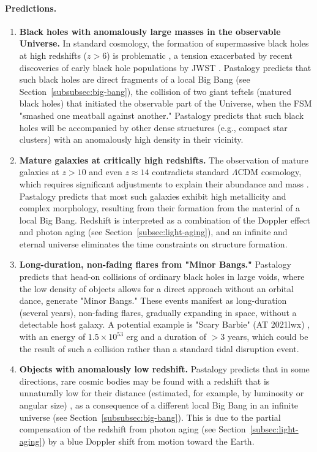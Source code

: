 \documentclass[pdflatex,sn-mathphys-num,referee]{sn-jnl}
\begin{document}
\paragraph{Predictions.}
\begin{enumerate}
    \item \textbf{Black holes with anomalously large masses in the observable Universe.} In standard cosmology, the formation of supermassive black holes at high redshifts (\( z > 6 \)) is problematic \cite{larson2023-jwst-bh}, a tension exacerbated by recent discoveries of early black hole populations by JWST \cite{maiolino2024-jades-bh}. Pastalogy predicts that such black holes are direct fragments of a local Big Bang (see Section~\ref{subsubsec:big-bang}), the collision of two giant teftels (matured black holes) that initiated the observable part of the Universe, when the FSM "smashed one meatball against another." Pastalogy predicts that such black holes will be accompanied by other dense structures (e.g., compact star clusters) with an anomalously high density in their vicinity.    
    \item \textbf{Mature galaxies at critically high redshifts.} The observation of mature galaxies at \( z > 10 \) \cite{labbe2023-jwst-galaxies} and even \( z \approx 14 \) \cite{carniani2024-z14} contradicts standard \(\Lambda\)CDM cosmology, which requires significant adjustments to explain their abundance and mass \cite{lu2024-jwst-lcdm-tension}. Pastalogy predicts that most such galaxies exhibit high metallicity and complex morphology, resulting from their formation from the material of a local Big Bang. Redshift is interpreted as a combination of the Doppler effect and photon aging (see Section~\ref{subsec:light-aging}), and an infinite and eternal universe eliminates the time constraints on structure formation.
    \item \textbf{Long-duration, non-fading flares from "Minor Bangs."} Pastalogy predicts that head-on collisions of ordinary black holes in large voids, where the low density of objects allows for a direct approach without an orbital dance, generate "Minor Bangs." These events manifest as long-duration (several years), non-fading flares, gradually expanding in space, without a detectable host galaxy. A potential example is "Scary Barbie" (AT 2021lwx) \cite{subrayan2023-barbie}, with an energy of \( 1.5 \times 10^{53} \) erg and a duration of \( >3 \) years, which could be the result of such a collision rather than a standard tidal disruption event.
    \item \textbf{Objects with anomalously low redshift.} Pastalogy predicts that in some directions, rare cosmic bodies may be found with a redshift that is unnaturally low for their distance (estimated, for example, by luminosity or angular size) \cite{arp1987-quasars}, as a consequence of a different local Big Bang in an infinite universe (see Section~\ref{subsubsec:big-bang}). This is due to the partial compensation of the redshift from photon aging (see Section~\ref{subsec:light-aging}) by a blue Doppler shift from motion toward the Earth.
\end{enumerate}
 
\end{document}
